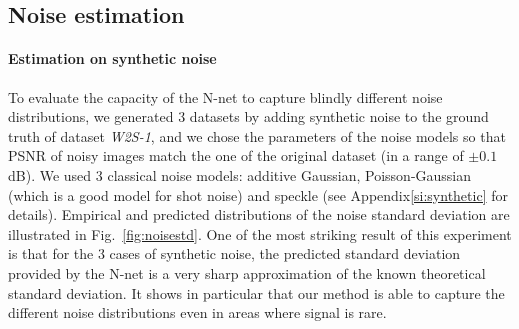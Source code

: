 \documentclass[lettersize,journal]{IEEEtran}
\begin{document}
\subsection{Noise estimation}
\label{sec:results:noise}
\paragraph{Estimation on synthetic noise}
To evaluate the capacity of the N-net to capture blindly different noise distributions, we generated 3 datasets by adding synthetic noise to the ground truth of dataset \textit{W2S-1}, and we chose the parameters of the noise models so that PSNR of noisy images match the one of the original dataset (in a range of $\pm0.1$dB).
We used 3 classical noise models: additive Gaussian, Poisson-Gaussian (which is a good model for shot noise) and speckle (see Appendix\ref{si:synthetic} for details).
Empirical and predicted distributions of the noise standard deviation are illustrated in Fig.~\ref{fig:noisestd}.
One of the most striking result of this experiment is that for the 3 cases of synthetic noise, the predicted standard deviation provided by the N-net is a very sharp approximation of the known theoretical standard deviation.
It shows in particular that our method is able to capture the different noise distributions even in areas where signal is rare.
\end{document}
